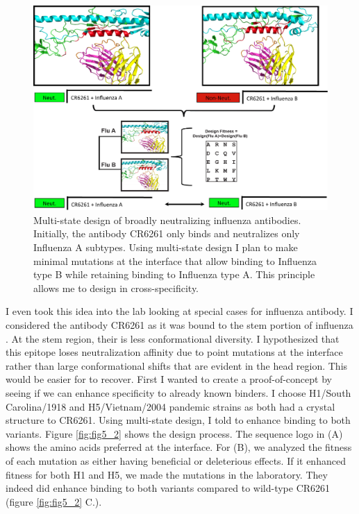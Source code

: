 \begin{figure}[t]
   \centering
   \includegraphics[width=.9\textwidth]{images/chapter5/figure5_1.pdf}
   \caption[Multi-state Design of Broadly Neutralizing Influenza Antibodies]{Multi-state design of broadly neutralizing influenza antibodies. Initially, the antibody CR6261 only binds and neutralizes only Influenza A subtypes. Using multi-state design I plan to make minimal mutations at the interface that allow binding to Influenza type B while retaining binding to Influenza type A. This principle allows me to design in cross-specificity.}
       \label{fig:fig5_1}
\end{figure}


I even took this idea into the lab looking at special cases for influenza antibody. I considered the antibody CR6261 as it was bound to the stem portion of influenza \citep{Corti:2011ku}. At the stem region, their is less conformational diversity. I hypothesized that this epitope loses neutralization affinity due to point mutations at the interface rather than large conformational shifts that are evident in the head region. This would be easier for \rosettadesign to recover. First I wanted to create a proof-of-concept by seeing if we can enhance specificity to already known binders. I choose H1/South Carolina/1918 and H5/Vietnam/2004 pandemic strains as both had a crystal structure to CR6261. Using multi-state design, I told \rosettadesign to enhance binding to both variants. Figure \ref{fig:fig5_2} shows the design process. The sequence logo in (A) shows the amino acids preferred at the interface. For (B), we analyzed the fitness of each mutation as either having beneficial or deleterious effects. If it enhanced fitness for both H1 and H5, we made the mutations in the laboratory. They indeed did enhance binding to both variants compared to wild-type CR6261 (figure \ref{fig:fig5_2} C.).


